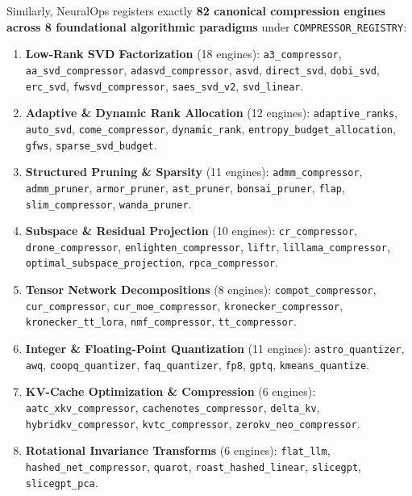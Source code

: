 \documentclass{article}
\begin{document}
Similarly, NeuralOps registers exactly \textbf{82 canonical compression engines across 8 foundational algorithmic paradigms} under \texttt{COMPRESSOR\_REGISTRY}:
\begin{enumerate}
    \item \textbf{Low-Rank SVD Factorization} (18 engines): \texttt{a3\_compressor}, \texttt{aa\_svd\_compressor}, \texttt{adasvd\_compressor}, \texttt{asvd}, \texttt{direct\_svd}, \texttt{dobi\_svd}, \texttt{erc\_svd}, \texttt{fwsvd\_compressor}, \texttt{saes\_svd\_v2}, \texttt{svd\_linear}.
    \item \textbf{Adaptive \& Dynamic Rank Allocation} (12 engines): \texttt{adaptive\_ranks}, \texttt{auto\_svd}, \texttt{come\_compressor}, \texttt{dynamic\_rank}, \texttt{entropy\_budget\_allocation}, \texttt{gfws}, \texttt{sparse\_svd\_budget}.
    \item \textbf{Structured Pruning \& Sparsity} (11 engines): \texttt{admm\_compressor}, \texttt{admm\_pruner}, \texttt{armor\_pruner}, \texttt{ast\_pruner}, \texttt{bonsai\_pruner}, \texttt{flap}, \texttt{slim\_compressor}, \texttt{wanda\_pruner}.
    \item \textbf{Subspace \& Residual Projection} (10 engines): \texttt{cr\_compressor}, \texttt{drone\_compressor}, \texttt{enlighten\_compressor}, \texttt{liftr}, \texttt{lillama\_compressor}, \texttt{optimal\_subspace\_projection}, \texttt{rpca\_compressor}.
    \item \textbf{Tensor Network Decompositions} (8 engines): \texttt{compot\_compressor}, \texttt{cur\_compressor}, \texttt{cur\_moe\_compressor}, \texttt{kronecker\_compressor}, \texttt{kronecker\_tt\_lora}, \texttt{nmf\_compressor}, \texttt{tt\_compressor}.
    \item \textbf{Integer \& Floating-Point Quantization} (11 engines): \texttt{astro\_quantizer}, \texttt{awq}, \texttt{coopq\_quantizer}, \texttt{faq\_quantizer}, \texttt{fp8}, \texttt{gptq}, \texttt{kmeans\_quantize}.
    \item \textbf{KV-Cache Optimization \& Compression} (6 engines): \texttt{aatc\_xkv\_compressor}, \texttt{cachenotes\_compressor}, \texttt{delta\_kv}, \texttt{hybridkv\_compressor}, \texttt{kvtc\_compressor}, \texttt{zerokv\_neo\_compressor}.
    \item \textbf{Rotational Invariance Transforms} (6 engines): \texttt{flat\_llm}, \texttt{hashed\_net\_compressor}, \texttt{quarot}, \texttt{roast\_hashed\_linear}, \texttt{slicegpt}, \texttt{slicegpt\_pca}.
\end{enumerate}
\end{document}
